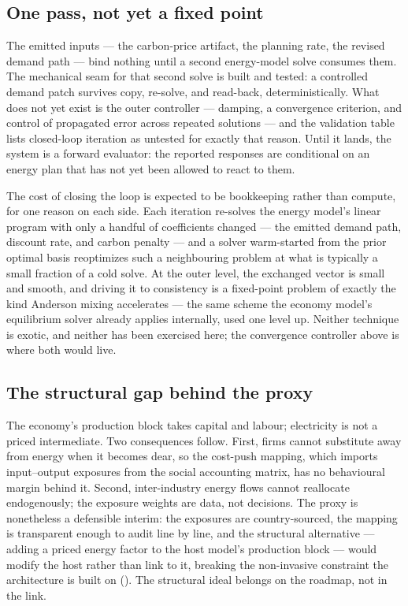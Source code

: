 \subsection{One pass, not yet a fixed point}
The emitted inputs --- the carbon-price artifact, the planning rate, the revised demand
path --- bind nothing until a second energy-model solve consumes them. The mechanical
seam for that second solve is built and tested: a controlled demand patch survives
copy, re-solve, and read-back, deterministically. What does not yet exist is the outer
controller --- damping, a convergence criterion, and control of propagated error across
repeated solutions --- and the validation table lists closed-loop iteration as untested
for exactly that reason. Until it lands, the system is a forward evaluator: the
reported responses are conditional on an energy plan that has not yet been allowed to
react to them.

The cost of closing the loop is expected to be bookkeeping rather than compute, for
one reason on each side. Each iteration re-solves the energy model's linear program
with only a handful of coefficients changed --- the emitted demand path, discount
rate, and carbon penalty --- and a solver warm-started from the prior optimal basis
reoptimizes such a neighbouring problem at what is typically a small fraction of a
cold solve. At the outer level, the exchanged vector is small and smooth, and driving
it to consistency is a fixed-point problem of exactly the kind Anderson mixing
accelerates --- the same scheme the economy model's equilibrium solver already applies
internally, used one level up. Neither technique is exotic, and neither has been
exercised here; the convergence controller above is where both would live.

\subsection{The structural gap behind the proxy}
The economy's production block takes capital and labour; electricity is not a priced
intermediate. Two consequences follow. First, firms cannot substitute away from energy
when it becomes dear, so the cost-push mapping, which imports input--output exposures
from the social accounting matrix, has no behavioural margin behind it. Second,
inter-industry energy flows cannot reallocate endogenously; the exposure weights are
data, not decisions. The proxy is nonetheless a defensible interim: the exposures are
country-sourced, the mapping is transparent enough to audit line by line, and the
structural alternative --- adding a priced energy factor to the host model's
production block --- would modify the host rather than link to it, breaking the
non-invasive constraint the architecture is built on (). The
structural ideal belongs on the roadmap, not in the link.

